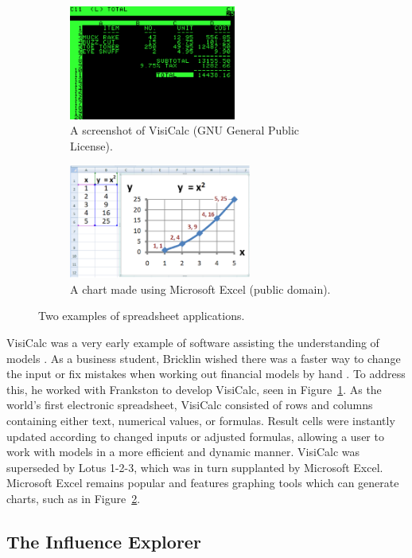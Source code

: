 \begin{figure}
\centering
	\begin{subfigure}[b]{0.475\textwidth}
		\centering
		\includegraphics[height=3.75cm]{figures/eps/visicalc.eps}
		\caption{A screenshot of VisiCalc (GNU General Public License).}
		\label{fig:visicalc}
	\end{subfigure}	
	\begin{subfigure}[b]{0.475\textwidth}
		\centering
		\includegraphics[height=3.75cm]{figures/eps/excel.eps}
		\caption{A chart made using Microsoft Excel (public domain).}
		\label{fig:excel}
	\end{subfigure}
	\caption{Two examples of spreadsheet applications.}
	\label{fig:spreadsheets}
\end{figure}

VisiCalc was a very early example of software assisting the understanding of models \cite{grad2007}.  As a business student, Bricklin wished there was a faster way to change the input or fix mistakes when working out financial models by hand \cite{bricklin1999}.  To address this, he worked with Frankston to develop VisiCalc, seen in Figure~\ref{fig:visicalc}.  As the world's first electronic spreadsheet, VisiCalc consisted of rows and columns containing either text, numerical values, or formulas.  Result cells were instantly updated according to changed inputs or adjusted formulas, allowing a user to work with models in a more efficient and dynamic manner.  VisiCalc was superseded by Lotus 1-2-3, which was in turn supplanted by Microsoft Excel.  Microsoft Excel remains popular and features graphing tools which can generate charts, such as in Figure~\ref{fig:excel}.

\subsection{The Influence Explorer}

